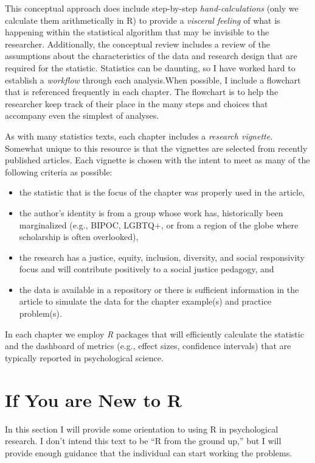 \documentclass[
  english,
]{book}
\providecommand{\tightlist}{%
  \setlength{\itemsep}{0pt}\setlength{\parskip}{0pt}}
\begin{document}
This conceptual approach does include step-by-step \emph{hand-calculations} (only we calculate them arithmetically in R) to provide a \emph{visceral feeling} of what is happening within the statistical algorithm that may be invisible to the researcher. Additionally, the conceptual review includes a review of the assumptions about the characteristics of the data and research design that are required for the statistic. Statistics can be daunting, so I have worked hard to establish a \emph{workflow} through each analysis.When possible, I include a flowchart that is referenced frequently in each chapter. The flowchart is to help the researcher keep track of their place in the many steps and choices that accompany even the simplest of analyses.

As with many statistics texts, each chapter includes a \emph{research vignette.} Somewhat unique to this resource is that the vignettes are selected from recently published articles. Each vignette is chosen with the intent to meet as many of the following criteria as possible:

\begin{itemize}
\tightlist
\item
  the statistic that is the focus of the chapter was properly used in the article,
\item
  the author's identity is from a group whose work has, historically been marginalized (e.g., BIPOC, LGBTQ+, or from a region of the globe where scholarship is often overlooked),
\item
  the research has a justice, equity, inclusion, diversity, and social responsivity focus and will contribute positively to a social justice pedagogy, and
\item
  the data is available in a repository or there is sufficient information in the article to simulate the data for the chapter example(s) and practice problem(s).
\end{itemize}

In each chapter we employ \emph{R} packages that will efficiently calculate the statistic and the dashboard of metrics (e.g., effect sizes, confidence intervals) that are typically reported in psychological science.

\hypertarget{if-you-are-new-to-r}{%
\section{If You are New to R}\label{if-you-are-new-to-r}}

In this section I will provide some orientation to using R in psychological research. I don't intend this text to be ``R from the ground up,'' but I will provide enough guidance that the individual can start working the problems.
\end{document}
